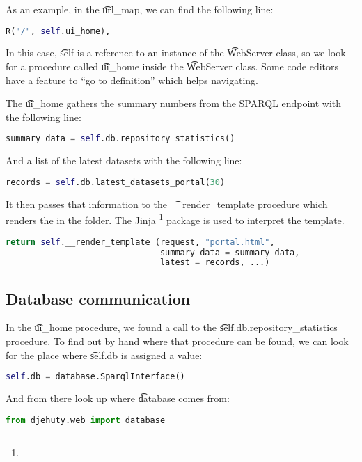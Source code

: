 As an example, in the \t{url\_map}, we can find the following line:
\begin{lstlisting}[language=python]
R("/", self.ui_home),
\end{lstlisting}

In this case, \t{self} is a reference to an instance of the \t{WebServer}
class, so we look for a procedure called \t{ui\_home} inside the
\t{WebServer} class.  Some code editors have a feature to ``go to definition''
which helps navigating.

The \t{ui\_home} gathers the summary numbers from the SPARQL endpoint
with the following line:
\begin{lstlisting}[language=python]
summary_data = self.db.repository_statistics()
\end{lstlisting}

And a list of the latest datasets with the following line:
\begin{lstlisting}[language=python]
records = self.db.latest_datasets_portal(30)
\end{lstlisting}

It then passes that information to the \t{\_\_render\_template}
procedure which renders the  in the
 folder.  The Jinja%
\footnote{} package
is used to interpret the template.

\begin{lstlisting}[language=python]
return self.__render_template (request, "portal.html",
                               summary_data = summary_data,
                               latest = records, ...)
\end{lstlisting}

\subsection{Database communication}

In the \t{ui\_home} procedure, we found a call to the
\t{self.db.repository\_statistics} procedure.  To find out by hand where that
procedure can be found, we can look for the place where \t{self.db} is
assigned a value:

\begin{lstlisting}[language=python]
self.db = database.SparqlInterface()
\end{lstlisting}

And from there look up where \t{database} comes from:
\begin{lstlisting}[language=python]
from djehuty.web import database
\end{lstlisting}

